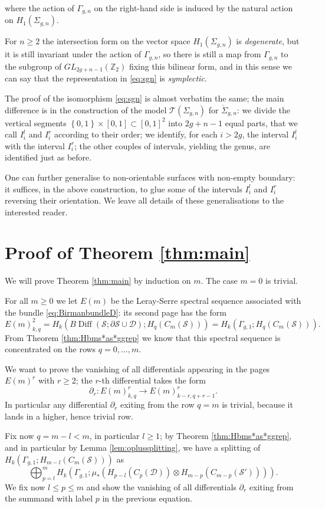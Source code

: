\documentclass{amsart}
\theoremstyle{plain}
\theoremstyle{definition}
\newcommand{\D}{\mathcal{D}}
\renewcommand{\S}{\mathcal{S}}
\newcommand{\T}{\mathcal{T}}
\newcommand{\Z}{\mathbb{Z}}
\renewcommand{\gg}{\Gamma_{g,1}}
\newcommand{\cms}{C_m(\S)}
\newcommand{\pa}[1]{\left(#1\right)}
\newcommand{\set}[1]{\left\{#1\right\}}
\DeclareMathOperator{\Diff}{Diff}
\begin{document}
where the action of $\Gamma_{g,n}$ on the right-hand side is induced by the natural
action on $H_1(\Sigma_{g,n})$.

For $n\geq 2$ the intersection form on the vector space $H_1(\Sigma_{g,n})$
is \emph{degenerate}, but it is still invariant under the action of
$\Gamma_{g,n}$, so there is still a map from $\Gamma_{g,n}$ to the subgroup
of $GL_{2g+n-1}(\Z_2)$ fixing this bilinear form, and in this sense we can say
that the representation in \eqref{eq:sgn} is \emph{symplectic}.

The proof of the isomorphism \eqref{eq:sgn} is almost verbatim the same; the main difference is in the construction of the
model $\T(\Sigma_{g,n})$ for $\mathring{\Sigma}_{g,n}$: we divide the
vertical segments $\set{0,1}\times[0,1]\subset[0,1]^2$
into $2g+n-1$ equal parts, that we call $I_i^l$ and $I_i^r$ according to their order;
we identify, for each $i>2g$, the interval $I_i^l$ with the interval $I_i^r$;
the other couples of intervals, yielding the genus, are identified just as before.

One can further generalise to non-orientable surfaces with non-empty boundary: it suffices,
in the above construction, to glue some of the intervals $I_i^l$ and $I_i^r$ reversing their
orientation. We leave all details of these generalisations to the interested reader.

\section{Proof of Theorem \ref{thm:main}}
\label{sec:sseq}
We will prove Theorem \ref{thm:main} by induction on $m$.
The case $m=0$ is trivial.

For all $m\geq 0$ we let $E(m)$ be the Leray-Serre spectral sequence associated with
the bundle \eqref{eq:BirmanbundleD}: its second page has the form
\[
 E(m)^2_{k,q}=H_k(B\Diff(\S;\partial\S\cup\D);H_q(\cms))=H_k(\gg;H_q(\cms)).
\]
From Theorem \ref{thm:Hbms*as*ggrep} we know that this spectral sequence is concentrated
on the rows $q=0,\dots, m$.

We want to prove the vanishing of all differentials appearing in the pages
$E(m)^r$ with $r\geq 2$; the $r$-th differential takes the form
\[
 \partial_r\colon E(m)^r_{k,q}\to E(m)^r_{k-r,q+r-1}.
\]
In particular any differential $\partial_r$ exiting from the row $q=m$ is trivial,
because it lands in a higher, hence trivial row.

Fix now $q=m-l<m$, in particular $l\geq 1$; by Theorem \ref{thm:Hbms*as*ggrep}, and
in particular by Lemma \ref{lem:oplussplitting}, we have a splitting of $H_k(\gg;H_{m-l}(\cms))$ as
\begin{equation}
\label{eq:Hksplitting}
 \bigoplus_{p=l}^m H_k\pa{\gg;\mu_*\pa{H_{p-l}(C_p(\D))\otimes H_{m-p}(C_{m-p}(\S'))}}.
\end{equation} 
We fix now $l\leq p\leq m$ and show the vanishing of all differentials $\partial_r$ exiting from the
summand with label $p$ in the previous equation.
\end{document}
